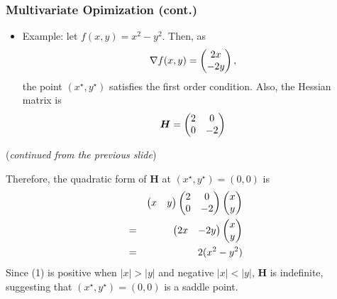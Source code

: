 \documentclass[pdflatex, 12pt]{beamer}
\begin{document}
\begin{frame}
\frametitle{Multivariate Opimization (cont.)}
\begin{itemize}
\item Example: let $f(x, y) = x^2 - y^2$. Then, as
 \begin{equation}
 \nabla f(x, y) = \begin{pmatrix}
 2x \\
 -2y \\
 \end{pmatrix}, \notag
 \end{equation} 
the point $(x^{\star}, y^{\star})$ satisfies the first order condition. Also, the Hessian matrix is
 \begin{equation}
 \bm{H} = \begin{pmatrix}
 2 & 0 \\
 0 & -2 \\
 \end{pmatrix} \notag
 \end{equation}
\end{itemize}
\end{frame}

\begin{frame}
(\emph{continued from the previous slide})

\vspace{0.4cm}
Therefore, the quadratic form of $\bm{H}$ at $(x^{\star}, y^{\star}) = (0, 0)$ is
 \begin{eqnarray}
 && \begin{pmatrix}
 x & y \\
 \end{pmatrix} \begin{pmatrix}
 2 & 0 \\
 0 & -2 \\
 \end{pmatrix} \begin{pmatrix}
 x \\
 y \\
 \end{pmatrix} \notag \\
 &=& \begin{pmatrix}
 2x & -2y
 \end{pmatrix} \begin{pmatrix}
 x \\
 y \\
 \end{pmatrix} \notag \\
 &=& 2(x^2 - y^2)
 \end{eqnarray}
Since (1) is positive when $|x| > |y|$ and negative $|x| < |y|$, $\bm{H}$ is indefinite, suggesting that $(x^{\star}, y^{\star}) = (0, 0)$ is a saddle point.
\end{frame}
\end{document}
